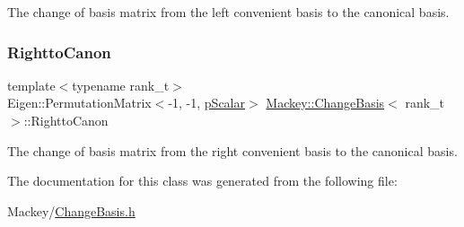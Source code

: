 The change of basis matrix from the left convenient basis to the canonical basis. 

\mbox{\label{classMackey_1_1ChangeBasis_abde8b2dd297be6e5bff1f72c2a3cd208}} 
\subsubsection{\texorpdfstring{Rightto\+Canon}{RighttoCanon}}
{\footnotesize\ttfamily template$<$typename rank\+\_\+t$>$ \\
Eigen\+::\+Permutation\+Matrix$<$-\/1, -\/1, \hyperlink{namespaceMackey_a4f147e328c520f568f5d3adf1c75f514}{p\+Scalar}$>$ \hyperlink{classMackey_1_1ChangeBasis}{Mackey\+::\+Change\+Basis}$<$ rank\+\_\+t $>$\+::Rightto\+Canon}



The change of basis matrix from the right convenient basis to the canonical basis. 



The documentation for this class was generated from the following file\+:\begin{DoxyCompactItemize}
\item 
Mackey/\hyperlink{ChangeBasis_8h}{Change\+Basis.\+h}\end{DoxyCompactItemize}
